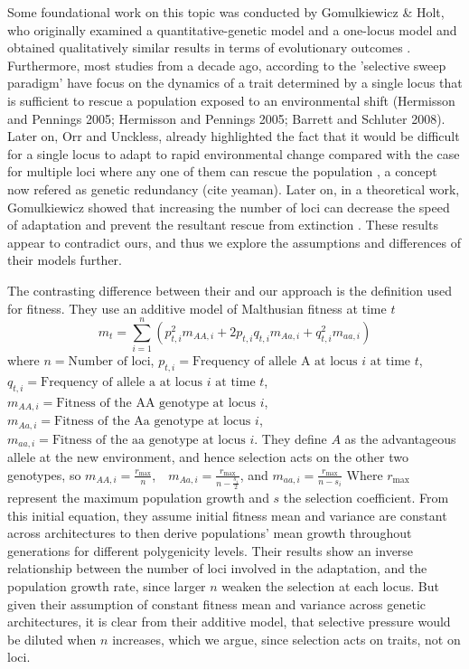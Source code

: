 \documentclass{article}
\begin{document}
Some foundational work on this topic was conducted by Gomulkiewicz \& Holt, who originally examined a quantitative-genetic model and a one-locus model  and obtained qualitatively similar results in terms of evolutionary outcomes \citep{Gomulkiewicz1995-sj}.  Furthermore, most studies from a decade ago, according to the 'selective sweep paradigm'  have focus on the dynamics of a trait determined by a single locus that is sufficient to rescue a population exposed to an environmental shift (Hermisson and Pennings 2005;  Hermisson and Pennings 2005; Barrett and Schluter 2008). Later on, Orr and Unckless, already highlighted the fact that it would be difficult for a single locus to adapt to rapid environmental change compared with the case for multiple loci where any one of them can rescue the population \citep{Orr2014-yn}, a concept now refered as genetic redundancy (cite yeaman). Later on,  in a theoretical work, Gomulkiewicz showed that increasing the number of loci can decrease the speed of adaptation and prevent the resultant rescue from extinction \citep{Gomulkiewicz2010-wr}. These results appear to contradict ours, and thus we explore the assumptions and differences of their models further. 

The contrasting difference between their and our approach is the definition used for fitness. They use an additive model of Malthusian fitness at time $t$ 
\[
m_t = \sum_{i=1}^{n} \left( p_{t,i}^2 m_{AA,i} + 2p_{t,i} q_{t,i} m_{Aa,i} + q_{t,i}^2 m_{aa,i} \right)
\]
where  
$n = \text{Number of loci}$, $p_{t,i} = \text{Frequency of allele A at locus } i \text{ at time } t$, 
$q_{t,i} = \text{Frequency of allele a at locus } i \text{ at time } t$, $m_{AA,i} = \text{Fitness of the AA genotype at locus } i$,
$m_{Aa,i} = \text{Fitness of the Aa genotype at locus } i$,
$m_{aa,i} = \text{Fitness of the aa genotype at locus } i $. They define $A$ as the advantageous allele at the new environment, and hence selection acts on the other two genotypes, so $m_{AA,i} = \frac{r_{\text{max}}}{n}$, $\text{ } m_{Aa,i} = \frac{r_{\text{max}}}{n - \frac{s_i}{2}} $, and $m_{aa,i} = \frac{r_{\text{max}}}{n - s_i} $
Where $r_{\text{max}}$ represent the maximum population growth and $s$ the selection coefficient. 
From this initial equation, they assume initial fitness mean and variance are constant across architectures to then derive populations' mean growth throughout generations for different polygenicity levels. Their results show an inverse relationship between the number of loci involved in the adaptation, and the population growth rate, since larger $n$ weaken the selection at each locus. But given their assumption of constant fitness mean and variance across genetic architectures, it is clear from their additive model, that selective pressure would be diluted when $n$ increases, which we argue, since selection acts on traits, not on loci. 
\end{document}
